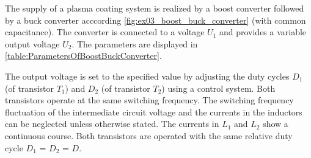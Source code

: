 







The supply of a plasma coating system is realized by a boost converter followed by a buck converter acccording \autoref{fig:ex03_boost_buck_converter} (with common capacitance).
The converter is connected to a voltage $U_\mathrm{1}$ and provides a variable output voltage $U_\mathrm{2}$. The parameters are displayed in \autoref{table:ParametersOfBoostBuckConverter}.
\vspace{2em}\par

\par

\par


The output voltage is set to the specified value by adjusting the duty cycles $D_\mathrm{1}$ (of transistor $T_\mathrm{1}$) 
and $D_\mathrm{2}$ (of transistor $T_\mathrm{2}$) using a control system. Both transistors operate at the same switching frequency. 
The switching frequency fluctuation of the intermediate circuit voltage and the currents in the inductors can be neglected unless otherwise stated. 
The currents in $L_\mathrm{1}$ and $L_\mathrm{2}$ show a continuous course. Both transistors are operated with the 
same relative duty cycle $D_\mathrm{1}$ = $D_\mathrm{2}$ = $D$.

